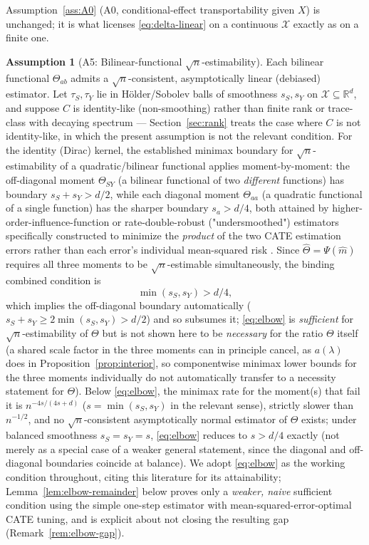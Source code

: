 \documentclass[11pt]{article}
\theoremstyle{plain}
\theoremstyle{definition}
\newtheorem{assumption}{Assumption}
\theoremstyle{remark}
\newcommand{\R}{\mathbb{R}}
\newcommand{\cX}{\mathcal{X}}
\begin{document}
Assumption~\ref{ass:A0} (A0, conditional-effect transportability given $X$) is
unchanged; it is what licenses \eqref{eq:delta-linear} on a continuous $\cX$ exactly
as on a finite one.

\begin{assumption}[A5: Bilinear-functional $\sqrt n$-estimability]\label{ass:elbow}
Each bilinear functional $\Theta_{ab}$ admits a $\sqrt n$-consistent, asymptotically
linear (debiased) estimator. Let $\tau_S,\tau_Y$ lie in H\"older/Sobolev balls of
smoothness $s_S,s_Y$ on $\cX\subseteq\R^d$, and suppose $C$ is identity-like
(non-smoothing) rather than finite rank or trace-class with decaying spectrum ---
Section~\ref{sec:rank} treats the case where $C$ is not identity-like, in which the
present assumption is not the relevant condition. For the identity (Dirac) kernel,
the established minimax boundary for $\sqrt n$-estimability of a quadratic/bilinear
functional applies moment-by-moment: the off-diagonal moment $\Theta_{SY}$ (a
bilinear functional of two \emph{different} functions) has boundary $s_S+s_Y>d/2$,
while each diagonal moment $\Theta_{aa}$ (a quadratic functional of a single
function) has the sharper boundary $s_a>d/4$, both attained by
higher-order-influence-function or rate-double-robust ("undersmoothed")
estimators specifically constructed to minimize the \emph{product} of the two CATE
estimation errors rather than each error's individual mean-squared risk
\citep{BickelRitov1988,BirgeMassart1995,Robins2008HOIF,Robins2017Minimax,Kennedy2024Minimax}.
Since $\hat\Theta=\Psi(\hat m)$ requires all three moments to be $\sqrt n$-estimable
simultaneously, the binding combined condition is
\begin{equation}\label{eq:elbow}
    \min(s_S,s_Y) > d/4,
\end{equation}
which implies the off-diagonal boundary automatically
($s_S+s_Y\ge2\min(s_S,s_Y)>d/2$) and so subsumes it; \eqref{eq:elbow} is
\emph{sufficient} for $\sqrt n$-estimability of $\Theta$ but is not shown here to be
\emph{necessary} for the ratio $\Theta$ itself (a shared scale factor in the three
moments can in principle cancel, as $a(\lambda)$ does in
Proposition~\ref{prop:interior}, so componentwise minimax lower bounds for the three
moments individually do not automatically transfer to a necessity statement for
$\Theta$). Below \eqref{eq:elbow}, the minimax rate for the moment(s) that fail it is
$n^{-4s/(4s+d)}$ ($s=\min(s_S,s_Y)$ in the relevant sense), strictly slower than
$n^{-1/2}$, and no $\sqrt n$-consistent asymptotically normal estimator of $\Theta$
exists; under balanced smoothness $s_S=s_Y=s$, \eqref{eq:elbow} reduces to $s>d/4$
exactly (not merely as a special case of a weaker general statement, since the
diagonal and off-diagonal boundaries coincide at balance). We adopt \eqref{eq:elbow}
as the working condition throughout, citing this literature for its attainability;
Lemma~\ref{lem:elbow-remainder} below proves only a \emph{weaker, naive} sufficient
condition using the simple one-step estimator with mean-squared-error-optimal CATE
tuning, and is explicit about not closing the resulting gap
(Remark~\ref{rem:elbow-gap}).
\end{assumption}
\end{document}
